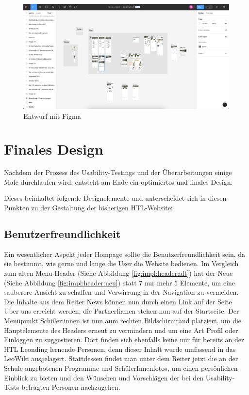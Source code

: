 \begin{figure}
   \begin{minipage}[b]{\linewidth} 
      \includegraphics[width=\linewidth]{pics/figma.png}
      \caption{Entwurf mit Figma}
      \label{fig:impl:figma_entwurf}
   \end{minipage}
   \hspace{.05\linewidth}
\end{figure}



\section{Finales Design}
Nachdem der Prozess des Usability-Testings und der Überarbeitungen einige Male durchlaufen
wird, entsteht am Ende ein optimiertes und finales Design. 

Dieses beinhaltet folgende Designelemente und unterscheidet sich in diesen Punkten zu der Gestaltung der bisherigen HTL-Website:


\subsection{Benutzerfreundlichkeit}
Ein wesentlicher Aspekt jeder Hompage sollte die Benutzerfreundlichkeit sein, da sie bestimmt, wie gerne und lange die User die Website bedienen.   
Im Vergleich zum alten Menu-Header (Siehe Abbildung \ref{fig:impl:header:alt}) hat der Neue (Siehe Abbildung \ref{fig:impl:header:neu}) statt 7 nur mehr 5 Elemente, um eine sauberere
   Ansicht zu schaffen und Verwirrung in der Navigation zu vermeiden. Die Inhalte aus dem Reiter \glqq News\grqq{} können nun durch einen Link auf der Seite
   \glqq Über uns\glqq{} erreicht werden, die Partnerfirmen stehen nun auf der Startseite. Der Menüpunkt \glqq Schüler:innen\grqq{} ist nun
   aum rechten Bildschirmrand platziert, um die Hauptelemente des Headers erneut zu vermindern und um eine Art \glqq Profil\grqq{}
   oder \glqq Einloggen\glqq{} zu suggestieren. Dort finden sich ebenfalls keine nur für bereits an der HTL Leonding
   lernende Personen, denn dieser Inhalt wurde umfassend in das LeoWiki ausgelagert. Stattdessen findet man unter 
   dem Reiter jetzt die an der Schule angebotenen Programme und SchülerInnenfotos, um einen persönlichen Einblick zu bieten und 
   den Wünschen und Vorschlägen der bei den Usability-Tests befragten Personen nachzugehen.

